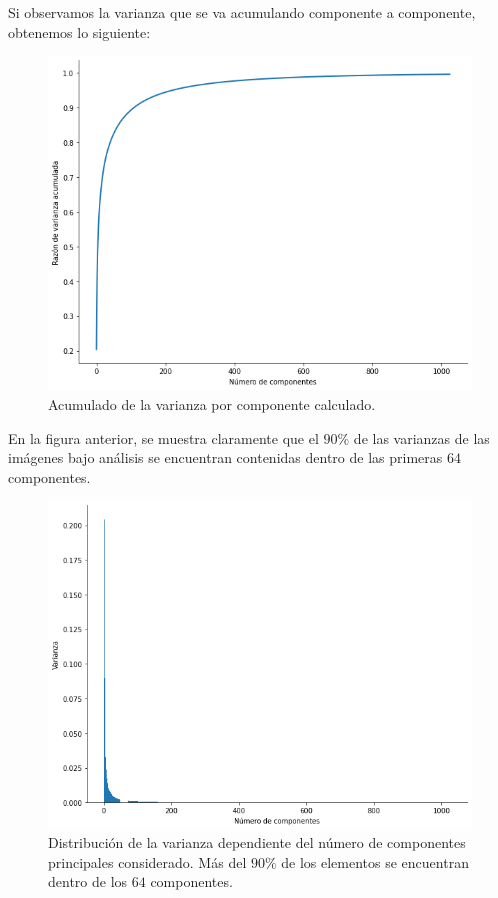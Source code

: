 \documentclass[conference]{IEEEtran}
\begin{document}
Si observamos la varianza que se va acumulando componente a componente, obtenemos lo siguiente:

\begin{figure}[H]
    \centering
    \includegraphics[scale=0.25]{imgs/cum_componentes.png}
    \caption{Acumulado de la varianza por componente calculado.}
    \label{fig:svd_pc}
\end{figure}

En la figura anterior, se muestra claramente que el $90\%$ de las varianzas de las imágenes bajo análisis se encuentran contenidas dentro de las primeras $64$ componentes.

\begin{figure}[H]
    \centering
    \includegraphics[scale=0.25]{imgs/dist_var.png}
    \caption{Distribución de la varianza dependiente del número de componentes principales considerado. Más del $90\%$ de los elementos se encuentran dentro de los $64$ componentes.}
    \label{fig:svd_pc}
\end{figure}
\end{document}
